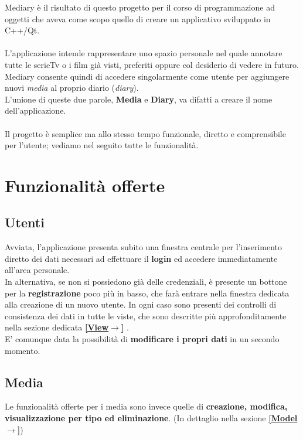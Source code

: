 \documentclass[10pt,a4paper,openany]{article}
\begin{document}
Mediary è il risultato di questo progetto per il corso di programmazione ad oggetti che aveva come scopo quello di creare un applicativo sviluppato in C++/Qt.\\\\
L'applicazione intende rappresentare uno spazio personale nel quale annotare tutte le serieTv o i film già visti, preferiti oppure col desiderio di vedere in futuro.\\
Mediary consente quindi di accedere singolarmente come utente per aggiungere nuovi \textit{media} al proprio diario (\textit{diary}).\\
L'unione di queste due parole, \textbf{Media} e \textbf{Diary}, va difatti a creare il nome dell'applicazione.\\\\
Il progetto è semplice ma allo stesso tempo funzionale, diretto e comprensibile per l'utente; vediamo nel seguito tutte le funzionalità.\vspace{20pt}



\section{Funzionalità offerte}
	\subsection{Utenti}

	Avviata, l'applicazione presenta subito una finestra centrale per l'inserimento diretto dei dati necessari ad effettuare il \textbf{login} ed 
	accedere  immediatamente all'area personale.\\
	In alternativa, se non si possiedono già delle credenziali, è presente un bottone per la \textbf{registrazione} poco più in basso, che farà 
	entrare nella finestra dedicata alla creazione di un nuovo utente.
	In ogni caso sono presenti dei controlli di consistenza dei dati in tutte le viste, che sono descritte più approfonditamente nella 
	sezione dedicata \hyperref[sec:view]{\bf [View$\rightarrow$]} .\\
	E' comunque data la possibilità di \textbf{modificare i propri dati} in un secondo momento.
		
	\subsection{Media}
	
	Le funzionalità offerte per i media sono invece quelle di \textbf{creazione, modifica, visualizzazione per tipo ed eliminazione}. (In 
	dettaglio  nella sezione \hyperref[sec:model]{\bf [Model$\rightarrow$]})\vspace{20pt}
	
\end{document}
